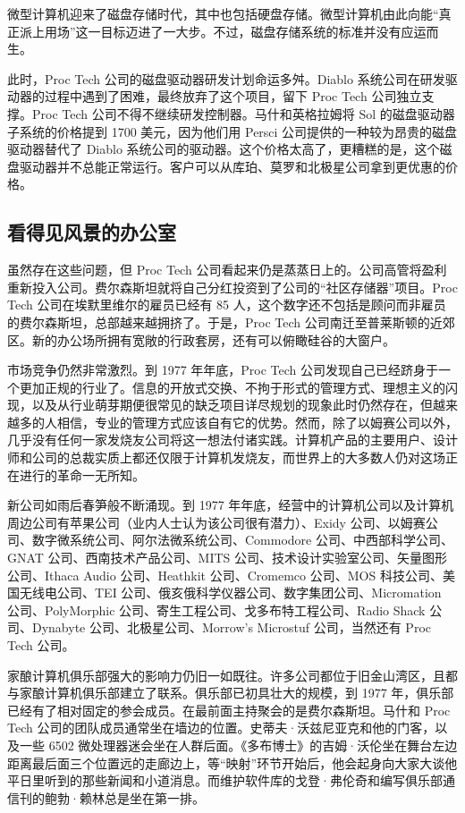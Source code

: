 \documentclass[12pt,UTF8]{ctexbook}
\begin{document}
微型计算机迎来了磁盘存储时代，其中也包括硬盘存储。微型计算机由此向能“真正派上用场”这一目标迈进了一大步。不过，磁盘存储系统的标准并没有应运而生。

此时，Proc Tech 公司的磁盘驱动器研发计划命运多舛。Diablo 系统公司在研发驱动器的过程中遇到了困难，最终放弃了这个项目，留下 Proc Tech 公司独立支撑。Proc Tech 公司不得不继续研发控制器。马什和英格拉姆将 Sol 的磁盘驱动器子系统的价格提到 1700 美元，因为他们用 Persci 公司提供的一种较为昂贵的磁盘驱动器替代了 Diablo 系统公司的驱动器。这个价格太高了，更糟糕的是，这个磁盘驱动器并不总能正常运行。客户可以从库珀、莫罗和北极星公司拿到更优惠的价格。





\subsection{看得见风景的办公室}


虽然存在这些问题，但 Proc Tech 公司看起来仍是蒸蒸日上的。公司高管将盈利重新投入公司。费尔森斯坦就将自己分红投资到了公司的“社区存储器”项目。Proc Tech 公司在埃默里维尔的雇员已经有 85 人，这个数字还不包括是顾问而非雇员的费尔森斯坦，总部越来越拥挤了。于是，Proc Tech 公司南迁至普莱斯顿的近郊区。新的办公场所拥有宽敞的行政套房，还有可以俯瞰硅谷的大窗户。

市场竞争仍然非常激烈。到 1977 年年底，Proc Tech 公司发现自己已经跻身于一个更加正规的行业了。信息的开放式交换、不拘于形式的管理方式、理想主义的闪现，以及从行业萌芽期便很常见的缺乏项目详尽规划的现象此时仍然存在，但越来越多的人相信，专业的管理方式应该自有它的优势。然而，除了以姆赛公司以外，几乎没有任何一家发烧友公司将这一想法付诸实践。计算机产品的主要用户、设计师和公司的总裁实质上都还仅限于计算机发烧友，而世界上的大多数人仍对这场正在进行的革命一无所知。

新公司如雨后春笋般不断涌现。到 1977 年年底，经营中的计算机公司以及计算机周边公司有苹果公司（业内人士认为该公司很有潜力）、Exidy 公司、以姆赛公司、数字微系统公司、阿尔法微系统公司、Commodore 公司、中西部科学公司、GNAT 公司、西南技术产品公司、MITS 公司、技术设计实验室公司、矢量图形公司、Ithaca Audio 公司、Heathkit 公司、Cromemco 公司、MOS 科技公司、美国无线电公司、TEI 公司、俄亥俄科学仪器公司、数字集团公司、Micromation 公司、PolyMorphic 公司、寄生工程公司、戈多布特工程公司、Radio Shack 公司、Dynabyte 公司、北极星公司、Morrow's Microstuf 公司，当然还有 Proc Tech 公司。

家酿计算机俱乐部强大的影响力仍旧一如既往。许多公司都位于旧金山湾区，且都与家酿计算机俱乐部建立了联系。俱乐部已初具壮大的规模，到 1977 年，俱乐部已经有了相对固定的参会成员。在最前面主持聚会的是费尔森斯坦。马什和 Proc Tech 公司的团队成员通常坐在墙边的位置。史蒂夫·沃兹尼亚克和他的门客，以及一些 6502 微处理器迷会坐在人群后面。《多布博士》的吉姆·沃伦坐在舞台左边距离最后面三个位置远的走廊边上，等“映射”环节开始后，他会起身向大家大谈他平日里听到的那些新闻和小道消息。而维护软件库的戈登·弗伦奇和编写俱乐部通信刊的鲍勃·赖林总是坐在第一排。
\end{document}
